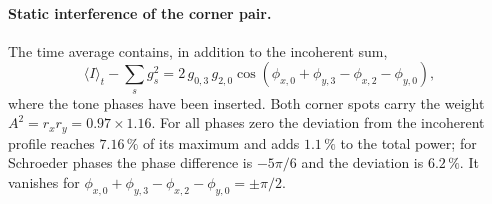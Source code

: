 \paragraph{Static interference of the corner pair.}
The time average contains, in addition to the incoherent sum,
\begin{equation}
\langle I\rangle_t-\sum_s g_s^2
=2\,g_{0,3}\,g_{2,0}\cos\!\left(\phi_{x,0}+\phi_{y,3}-\phi_{x,2}-\phi_{y,0}\right),
\end{equation}
where the tone phases have been inserted. Both corner spots carry the weight
$A^2=r_xr_y=0.97\times1.16$. For all phases zero the deviation from the
incoherent profile reaches $7.16\,\%$ of its maximum and adds $1.1\,\%$ to the
total power; for Schroeder phases the phase difference is $-5\pi/6$ and the
deviation is $6.2\,\%$. It vanishes for
$\phi_{x,0}+\phi_{y,3}-\phi_{x,2}-\phi_{y,0}=\pm\pi/2$.

